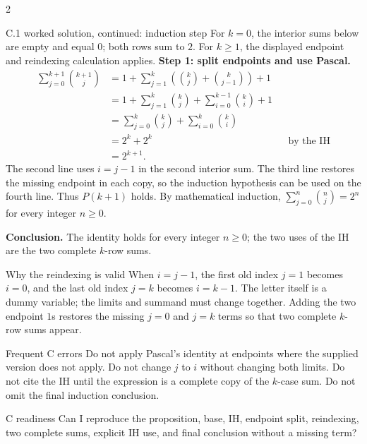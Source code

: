\documentclass[10pt]{article}
\begin{document}
\begin{multicols}{2}
\begin{workedbox}{C.1 worked solution, continued: induction step}
For $k=0$, the interior sums below are empty and equal $0$; both rows sum
to $2$. For $k\ge1$, the displayed endpoint and reindexing calculation applies.
\textbf{Step 1: split endpoints and use Pascal.}
\begin{align*}
\sum_{j=0}^{k+1}\binom{k+1}{j}
&=1+\sum_{j=1}^{k}
 \left(\binom kj+\binom{k}{j-1}\right)+1\\
&=1+\sum_{j=1}^{k}\binom kj
 +\sum_{i=0}^{k-1}\binom ki+1\\
&=\sum_{j=0}^{k}\binom kj
 +\sum_{i=0}^{k}\binom ki\\
&=2^k+2^k &&\text{by the IH}\\
&=2^{k+1}.
\end{align*}
The second line uses $i=j-1$ in the second interior sum. The third line
restores the missing endpoint in each copy, so the induction hypothesis can
be used on the fourth line. Thus $P(k+1)$ holds. By mathematical induction,
$\sum_{j=0}^{n}\binom nj=2^n$ for every integer $n\ge0$.

\textbf{Conclusion.} The identity holds for every integer $n\ge0$; the
two uses of the IH are the two complete $k$-row sums.
\end{workedbox}

\begin{definitionbox}{Why the reindexing is valid}
When $i=j-1$, the first old index $j=1$ becomes $i=0$, and the last old
index $j=k$ becomes $i=k-1$. The letter itself is a dummy variable; the
limits and summand must change together. Adding the two endpoint $1$s restores
the missing $j=0$ and $j=k$ terms so that two complete $k$-row sums appear.
\end{definitionbox}

\begin{warningbox}{Frequent C errors}
Do not apply Pascal's identity at endpoints where the supplied version does
not apply. Do not change $j$ to $i$ without changing both limits. Do not cite
the IH until the expression is a complete copy of the $k$-case sum. Do not
omit the final induction conclusion.
\end{warningbox}

\begin{checklistbox}{C readiness}
Can I reproduce the proposition, base, IH, endpoint split, reindexing, two
complete sums, explicit IH use, and final conclusion without a missing term?
\end{checklistbox}
\end{multicols}
\end{document}
